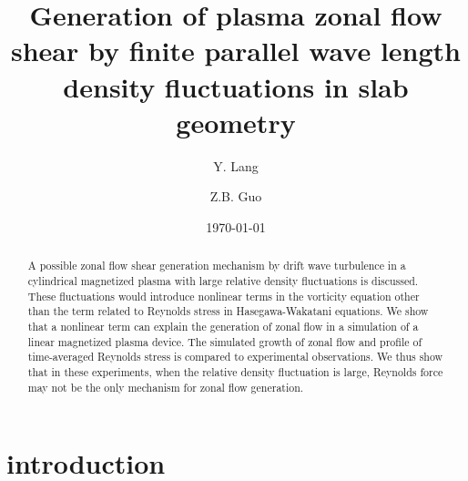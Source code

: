 \documentclass[aps,pre,twocolumn,superscriptaddress]{revtex4-1}
\begin{document}
\title{
Generation of plasma zonal flow shear by finite parallel wave length density fluctuations in slab geometry
}


\author{Y. Lang}
\author{Z.B. Guo}

\date{\today}


\begin{abstract}
A possible zonal flow shear generation mechanism by drift wave turbulence in a cylindrical magnetized plasma with large relative density fluctuations is discussed. These fluctuations would introduce nonlinear terms in the vorticity equation other than the term related to Reynolds stress in Hasegawa-Wakatani equations. We show that a nonlinear term can explain the generation of zonal flow in a simulation of a linear magnetized plasma device. The simulated growth of zonal flow and profile of time-averaged Reynolds stress is compared to experimental observations. We thus show that in these experiments, when the relative density fluctuation is large, Reynolds force may not be the only mechanism for zonal flow generation.
\end{abstract}
\maketitle


\section{\label{sec:introduction}introduction}
\end{document}
